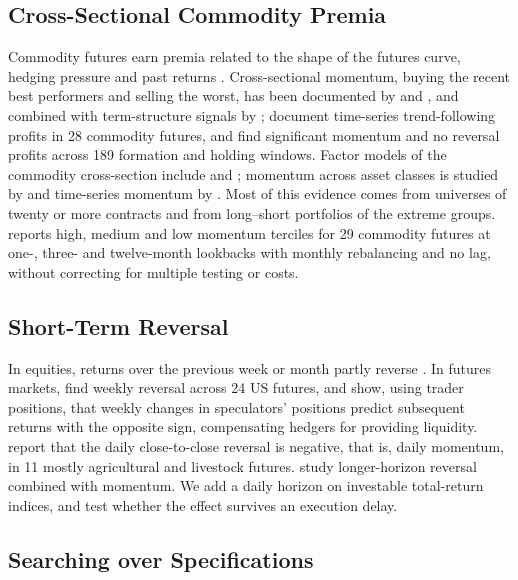 \documentclass[commodities,article,submit,pdftex,moreauthors]{Definitions/mdpi}
\begin{document}
\subsection{Cross-Sectional Commodity Premia}

Commodity futures earn premia related to the shape of the futures curve, hedging pressure and past returns \citep{erb2006,gorton2006,gorton2013,szymanowska2014}. Cross-sectional momentum, buying the recent best performers and selling the worst, has been documented by \citet{miffre2007} and \citet{shen2007}, and combined with term-structure signals by \citet{fuertes2010}; \citet{szakmary2010} document time-series trend-following profits in 28 commodity futures, and \citet{zhang2020} find significant momentum and no reversal profits across 189 formation and holding windows. Factor models of the commodity cross-section include \citet{bakshi2019} and \citet{daskalaki2014}; momentum across asset classes is studied by \citet{asness2013} and time-series momentum by \citet{moskowitz2012}. Most of this evidence comes from universes of twenty or more contracts and from long--short portfolios of the extreme groups. \citet{adhikari2024} reports high, medium and low momentum terciles for 29 commodity futures at one-, three- and twelve-month lookbacks with monthly rebalancing and no lag, without correcting for multiple testing or costs.

\subsection{Short-Term Reversal}

In equities, returns over the previous week or month partly reverse \citep{jegadeesh1990,lehmann1990}. In futures markets, \citet{wang2004} find weekly reversal across 24 US futures, and \citet{kang2020} show, using trader positions, that weekly changes in speculators' positions predict subsequent returns with the opposite sign, compensating hedgers for providing liquidity. \citet{dellacorte2015} report that the daily close-to-close reversal is negative, that is, daily momentum, in 11 mostly agricultural and livestock futures. \citet{bianchi2015} study longer-horizon reversal combined with momentum. We add a daily horizon on investable total-return indices, and test whether the effect survives an execution delay.

\subsection{Searching over Specifications}
\end{document}
